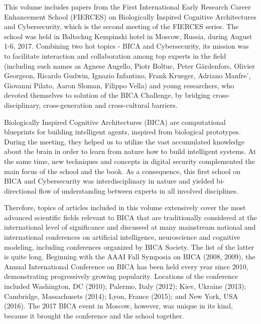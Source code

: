 \documentclass[10pt,fleqn,openany]{book} %
\begin{document}
This volume includes papers from the First International Early Research Career Enhancement School (FIERCES) on Biologically Inspired Cognitive Architectures and Cybersecurity, which is the second meeting of the FIERCES series. The school was held in Baltschug Kempinski hotel in Moscow, Russia, during August 1-6, 2017. Combining two hot topics - BICA and Cybersecurity, its mission was to facilitate interaction and collaboration among top experts in the field (including such names as Agnese Augello, Piotr Boltuc, Peter Gärdenfors, Olivier Georgeon, Ricardo Gudwin, Ignazio Infantino, Frank Krueger, Adriano Manfre', Giovanni Pilato, Aaron Sloman, Filippo Vella) and young researchers, who devoted themselves to solution of the BICA Challenge, by bridging cross-disciplinary, cross-generation and cross-cultural barriers. 

Biologically Inspired Cognitive Architectures (BICA) are computational blueprints for building intelligent agents, inspired from biological prototypes. During the meeting, they helped us to utilize the vast accumulated knowledge about the brain in order to learn from nature how to build intelligent systems. At the same time, new techniques and concepts in digital security complemented the main focus of the school and the book. As a consequence, this first school on BICA and Cybersecurity was interdisciplinary in nature and yielded bi-directional flow of understanding between experts in all involved disciplines.

Therefore, topics of articles included in this volume extensively cover the most advanced scientific fields relevant to BICA that are traditionally considered at the international level of significance and discussed at many mainstream national and international conferences on artificial intelligence, neuroscience and cognitive modeling, including conferences organized by BICA Society. The list of the latter is quite long. Beginning with the AAAI Fall Symposia on BICA (2008, 2009), the Annual International Conference on BICA has been held every year since 2010, demonstrating progressively growing popularity. Locations of the conference included Washington, DC (2010); Palermo, Italy (2012); Kiev, Ukraine (2013); Cambridge, Massachusets (2014); Lyon, France (2015); and New York, USA (2016). The 2017 BICA event in Moscow, however, was unique in its kind, because it brought the conference and the school together.
\end{document}
